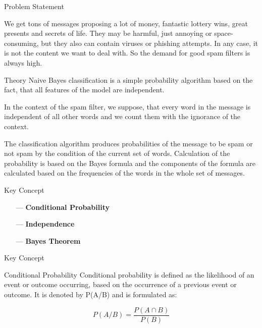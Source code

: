 \begin{frame}{Problem Statement}

We get tons of messages proposing a lot of money, fantastic lottery wins, great presents and secrets of life. They may be harmful, just annoying or space-consuming, but they also can contain viruses or phishing attempts. In any case, it is not the content we want to deal with. So the demand for good spam filters is always high.

\end{frame}

\begin{frame}{Theory}
Naive Bayes classification is a simple probability algorithm based on the fact, that all features of the model are independent.

In the context of the spam filter, we suppose, that every word in the message is independent of all other words and we count them with the ignorance of the context.

The classification algorithm produces probabilities of the message to be spam or not spam by the condition of the current set of words. Calculation of the probability is based on the Bayes formula and the components of the formula are calculated based on the frequencies of the words in the whole set of messages.
\end{frame}

\begin{frame}{Key Concept}

\begin{itemize}
    \item[---] \textbf{Conditional Probability}
    \item[---] \textbf{Independence}
    \item[---] \textbf{Bayes Theorem}
\end{itemize}

\end{frame}

\begin{frame}{Key Concept}

\begin{block}{Conditional Probability}
Conditional probability is defined as the likelihood of an event or outcome occurring, based on the occurrence of a previous event or outcome. It is denoted by P(A/B) and is formulated as:

$$
P(A/B) = \frac{P(A \cap B)}{P(B)}
$$
\end{block}

\end{frame}

